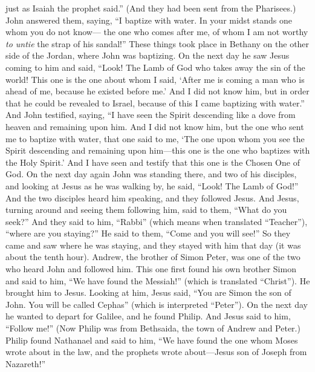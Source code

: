 \begin{biblechapter}
\verse just as Isaiah the prophet said.”
\verse (And they had been sent from the Pharisees.)
\verse John answered them, saying, “I baptize with water. In your midst stands one whom you do not know—
\verse the one who comes after me, of whom I am not worthy \textit{to untie} the strap of his sandal!”
\verse These things took place in Bethany on the other side of the Jordan, where John was baptizing.
\verse On the next day he saw Jesus coming to him and said, “Look! The Lamb of God who takes away the sin of the world!
\verse This one is the one about whom I said, ‘After me is coming a man who is ahead of me, because he existed before me.’
\verse And I did not know him, but in order that he could be revealed to Israel, because of this I came baptizing with water.”
\verse And John testified, saying, “I have seen the Spirit descending like a dove from heaven and remaining upon him.
\verse And I did not know him, but the one who sent me to baptize with water, that one said to me, ‘The one upon whom you see the Spirit descending and remaining upon him—this one is the one who baptizes with the Holy Spirit.’
\verse And I have seen and testify that this one is the Chosen One of God.
 On the next day again John was standing there, and two of his disciples,
\verse and looking at Jesus as he was walking by, he said, “Look! The Lamb of God!”
\verse And the two disciples heard him speaking, and they followed Jesus.
\verse And Jesus, turning around and seeing them following him, said to them, “What do you seek?” And they said to him, “Rabbi” (which means when translated “Teacher”), “where are you staying?”
\verse He said to them, “Come and you will see!” So they came and saw where he was staying, and they stayed with him that day (it was about the tenth hour).
 Andrew, the brother of Simon Peter, was one of the two who heard John and followed him.
\verse This one first found his own brother Simon and said to him, “We have found the Messiah!” (which is translated “Christ”).
\verse He brought him to Jesus. Looking at him, Jesus said, “You are Simon the son of John. You will be called Cephas” (which is interpreted “Peter”).
 On the next day he wanted to depart for Galilee, and he found Philip. And Jesus said to him, “Follow me!”
\verse (Now Philip was from Bethsaida, the town of Andrew and Peter.)
\verse Philip found Nathanael and said to him, “We have found the one whom Moses wrote about in the law, and the prophets wrote about—Jesus son of Joseph from Nazareth!”

\end{biblechapter}
